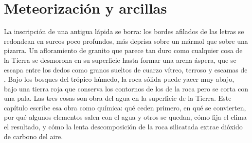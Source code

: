 \chapter{Meteorización y arcillas}\label{ch:b1:weathering-clays}

La inscripción de una antigua lápida se borra: los bordes afilados de las letras se redondean en surcos poco profundos, más deprisa
sobre un mármol que sobre una pizarra. Un afloramiento de granito que parece tan duro como cualquier cosa de la Tierra se desmorona en
su superficie hasta formar una arena áspera, que se escapa entre los dedos como granos sueltos de cuarzo vítreo,  terroso y
escamas de . Bajo los bosques del trópico húmedo, la roca sólida puede yacer muy abajo, bajo una tierra roja que conserva los
contornos de los  de la roca pero se corta con una pala. Las tres cosas son obra del agua en la superficie de la Tierra. Este
capítulo escribe esa obra como química: qué  ceden primero, en qué se convierten, por qué algunos elementos salen con el agua
y otros se quedan, cómo fija el clima el resultado, y cómo la lenta descomposición de la roca silicatada extrae dióxido de carbono del aire.

